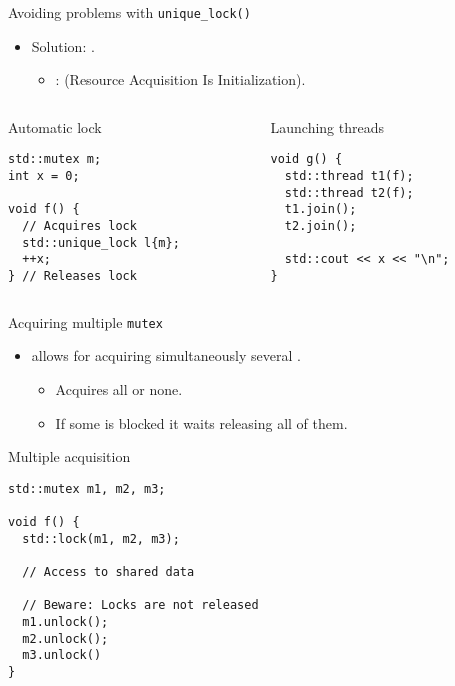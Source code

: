 \begin{frame}[t,fragile]{Avoiding problems with \texttt{unique\_lock()}}
\begin{itemize}
  \item Solution: .
    \begin{itemize}
      \item {}:  (Resource Acquisition Is Initialization).
    \end{itemize}
\end{itemize}

\begin{columns}[T]
\begin{column}{.5\textwidth}
\begin{block}{Automatic lock}
\begin{lstlisting}
std::mutex m;
int x = 0;

void f() {
  // Acquires lock
  std::unique_lock l{m}; 
  ++x;
} // Releases lock
\end{lstlisting}
\end{block}
\end{column}

\begin{column}{.5\textwidth}
\begin{block}{Launching threads}
\begin{lstlisting}
void g() {
  std::thread t1(f); 
  std::thread t2(f);
  t1.join(); 
  t2.join();

  std::cout << x << "\n";
}
\end{lstlisting}
\end{block}
\end{column}
\end{columns}
\end{frame}

\begin{frame}[t,fragile]{Acquiring multiple \texttt{mutex}}
\begin{itemize}
  \item {} allows for acquiring simultaneously several .
    \begin{itemize}
      \item Acquires all or none.
      \item If some is blocked it waits releasing all of them.
    \end{itemize}
\end{itemize}

\begin{block}{Multiple acquisition}
\begin{lstlisting}[basicstyle=\tiny]
std::mutex m1, m2, m3;

void f() {
  std::lock(m1, m2, m3);

  // Access to shared data

  // Beware: Locks are not released
  m1.unlock();
  m2.unlock();
  m3.unlock()
} 
\end{lstlisting}
\end{block}
\end{frame}

